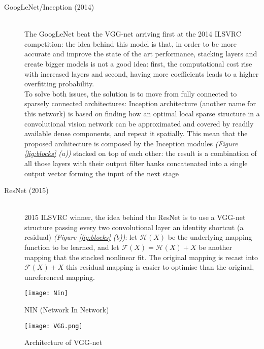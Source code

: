 \documentclass[../main.tex]{subfiles}
\begin{document}
\begin{description}
\item[GoogLeNet/Inception (2014)] \cite{Szegedy2015} \hfill \\ 
The GoogLeNet beat the VGG-net arriving first at the 2014 ILSVRC competition: the idea behind this model is that, in order to be more accurate and improve the state of the art performance, stacking layers and create bigger models is not a good idea: first, the computational cost rise with increased layers and second, having more coefficients leads to a higher overfitting probability. \\ 
To solve both issues, the solution is to move from fully connected to sparsely connected architectures: Inception architecture (another name for this network) is based on finding how an optimal local sparse structure in a convolutional vision network can be approximated and covered by readily available dense components, and repeat it spatially.\cite{Szegedy2015}
This mean that the proposed architecture is composed by the Inception modules \textit{(Figure \ref{fig:blocks} (a))} stacked on top of each other: the result is a combination of all those layers with their output filter banks concatenated into a single output vector forming the input of the next stage

\item[ResNet (2015)] \cite{Wu2017} \hfill \\
2015 ILSVRC winner, the idea behind the ResNet is to use a VGG-net structure passing every two convolutional layer an identity shortcut (a residual) \textit{(Figure \ref{fig:blocks} (b))}: let $\mathcal {H}(X)$ be the underlying mapping function to be learned, and let $\mathcal{F}(X)=\mathcal {H}(X) + X $ be another mapping that the stacked nonlinear fit. The original mapping is recast into $\mathcal{F}(X)+X$ this residual mapping is easier to optimise than the original, unreferenced mapping. \cite{Wu2017}
\end{description}

\begin{figure}[!hb]
  \centering
  \texttt{[image: Nin]}
  \caption{NIN (Network In Network) \cite{Lin2013}}
  \label{fig:nin}
\end{figure}

\begin{figure}[!ht]
  \centering
  \texttt{[image: VGG.png]}
  \caption{Architecture of VGG-net}
  \label{fig:vggnet}
\end{figure}
\end{document}
